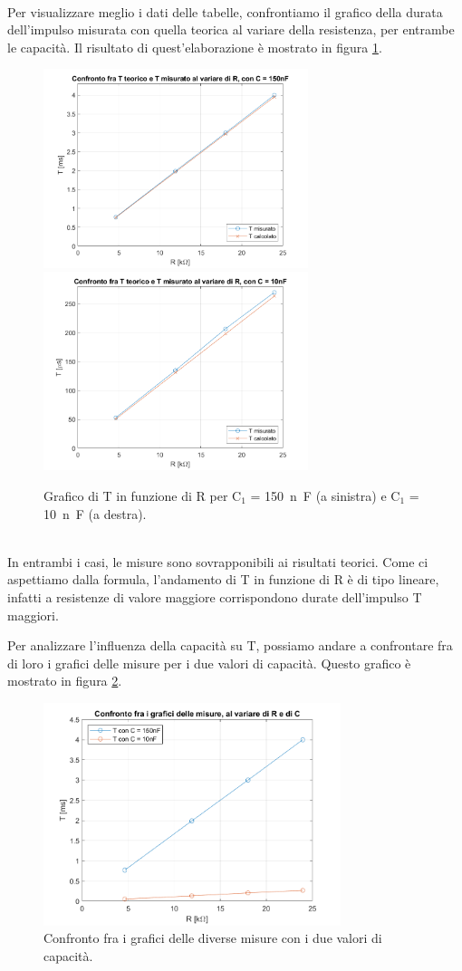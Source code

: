 \documentclass{report}
\begin{document}
\\ Per visualizzare meglio i dati delle tabelle, confrontiamo il grafico della durata dell'impulso misurata con quella teorica al variare della resistenza, per entrambe le capacità. Il risultato di quest'elaborazione è mostrato in figura \ref{figura:graf1e2}.\begin{figure}[h!]
	\centering
	\includegraphics[height=5.8cm]{immagini/graficomis1}
	\includegraphics[height=5.8cm]{immagini/graficomis2}
	\caption{Grafico di T in funzione di R per $\mathrm{C_1}$ = \SI{150}{n\farad} (a sinistra) e $\mathrm{C_1}$ = \SI{10}{n\farad} (a destra).}
	\label{figura:graf1e2}
\end{figure}
\\ In entrambi i casi, le misure sono sovrapponibili ai risultati teorici. Come ci aspettiamo dalla formula, l'andamento di T in funzione di R è di tipo lineare, infatti a resistenze di valore maggiore corrispondono durate dell'impulso T maggiori. \par
Per analizzare l'influenza della capacità su T, possiamo andare a confrontare fra di loro i grafici delle misure per i due valori di capacità. Questo grafico è mostrato in figura \ref{figura:confrontoplot}.
\begin{figure}[h!]
	\centering
	\includegraphics[height=6.5cm]{immagini/graficoconfronto1}
	\caption{Confronto fra i grafici delle diverse misure con i due valori di capacità.}
	\label{figura:confrontoplot}
\end{figure}
\end{document}
